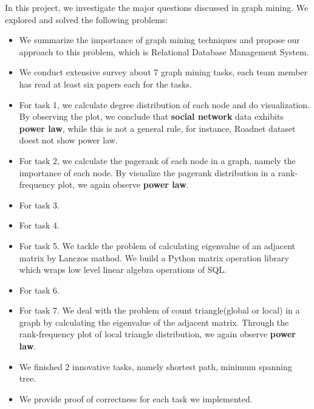 
In this project, we investigate the major questions discussed in graph mining. We 
explored and solved the following problems:

\begin{itemize}
    \item We summarize the importance of graph mining techniques and propose our approach
    to this problem, which is Relational Database Management System.
    \item We conduct extensive survey about 7 graph mining tasks, each team member has read
    at least six papers each for the tasks. 
    \item For task 1, we calculate degree distribution of each node and do visualization. By 
    observing the plot, we conclude that {\bf social network} data exhibits {\bf power law}, while
    this is not a general rule, for instance, Roadnet dataset doest not show power law.
    \item For task 2, we calculate the pagerank of each node in a graph, namely the importance of each
    node. By visualize the pagerank distribution in a rank-frequency plot, we again observe {\bf power law}.
    \item For task 3.
    \item For task 4.
    \item For task 5. We tackle the problem of calculating eigenvalue of an adjacent matrix by Lanczos mathod. We 
    build a Python matrix operation library which wraps low level linear algebra operations of SQL. 
    \item For task 6.
    \item For task 7. We deal with the problem of count triangle(global or local) in a graph by calculating the
    eigenvalue of the adjacent matrix. Through the rank-frequency plot of local triangle distribution, we again
    observe {\bf power law}.
    \item We finished 2 innovative tasks, namely shortest path, minimum spanning tree. 
    \item We provide proof of correctness for each task we implemented. 
\end{itemize}
